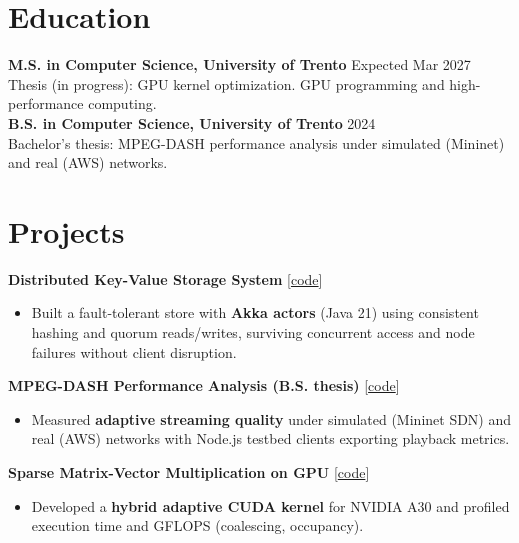 \section{Education}
\textbf{M.S. in Computer Science, University of Trento} \hfill Expected Mar 2027 \\
{\small Thesis (in progress): GPU kernel optimization. GPU programming and high-performance computing.} \\[4pt]
\textbf{B.S. in Computer Science, University of Trento} \hfill 2024 \\
{\small Bachelor's thesis: MPEG-DASH performance analysis under simulated (Mininet) and real (AWS) networks.}

\section{Projects}

\textbf{Distributed Key-Value Storage System} [\href{https://github.com/MaiDormo/distributed-storage-system}{code}]
\begin{itemize}[nosep, after=\strut, leftmargin=1.5em, itemsep=2pt, label=\color{accent}\textbullet]
    \item Built a fault-tolerant store with \textbf{Akka actors} (Java 21) using consistent hashing and quorum reads/writes, surviving concurrent access and node failures without client disruption.
\end{itemize}

\projectdivider
\textbf{MPEG-DASH Performance Analysis (B.S. thesis)} [\href{https://github.com/MaiDormo/mpeg-dash-analysis}{code}]
\begin{itemize}[nosep, after=\strut, leftmargin=1.5em, itemsep=2pt, label=\color{accent}\textbullet]
    \item Measured \textbf{adaptive streaming quality} under simulated (Mininet SDN) and real (AWS) networks with Node.js testbed clients exporting playback metrics.
\end{itemize}

\projectdivider
\textbf{Sparse Matrix-Vector Multiplication on GPU} [\href{https://github.com/MaiDormo/cuda-SpMV}{code}]
\begin{itemize}[nosep, after=\strut, leftmargin=1.5em, itemsep=2pt, label=\color{accent}\textbullet]
    \item Developed a \textbf{hybrid adaptive CUDA kernel} for NVIDIA A30 and profiled execution time and GFLOPS (coalescing, occupancy).
\end{itemize}

